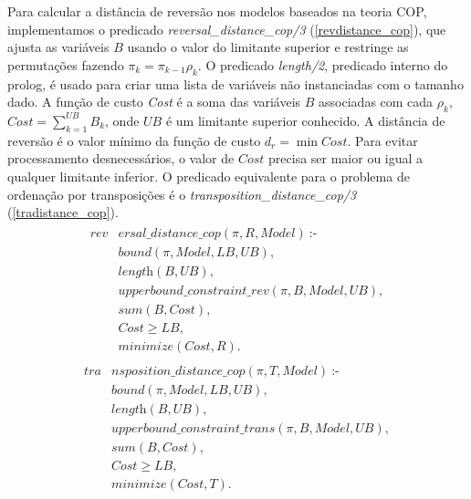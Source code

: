 Para calcular a distância de reversão nos modelos baseados na teoria
COP, implementamos o predicado \textit{reversal\_distance\_cop/3}
(\ref{revdistance_cop}), que ajusta as variáveis $B$ usando o valor do
limitante superior e restringe as permutações fazendo $\pi_{k}
= \pi_{k-1} \rho_{k}$. O predicado \textit{length/2}, predicado
interno do prolog, é usado para criar uma lista de variáveis não
instanciadas com o tamanho dado. A função de custo \textit{Cost} é a
soma das variáveis $B$ associadas com cada $\rho_{k}$, $Cost
= \sum_{k=1}^{UB} B_{k}$, onde $UB$ é um limitante superior
conhecido. A distância de reversão é o valor mínimo da função de custo
$d_{r} = \min Cost$. Para evitar processamento desnecessários, o valor
de $Cost$ precisa ser maior ou igual a qualquer limitante inferior. O
predicado equivalente para o problema de ordenação por transposições é
o \textit{transposition\_distance\_cop/3} (\ref{tradistance_cop}).
\begin{align}
  \label{revdistance_cop}
  \begin{split}
  \textit{rev}&\textit{ersal\_distance\_cop}(\pi, R, Model)~\text{:-} \\
  &\textit{bound}(\pi, Model, LB, UB), \\
  &\textit{length}(B, UB),  \\
  &\textit{upperbound\_constraint\_rev}(\pi, B, Model, UB), \\
  &\textit{sum}(B, Cost),  \\
  &\textit{Cost} \ge \textit{LB},  \\
  &\textit{minimize}(Cost, R). 
  \end{split}
\end{align}
\begin{align}
  \label{tradistance_cop}
  \begin{split}
  \textit{tra}&\textit{nsposition\_distance\_cop}(\pi, T, Model)~\text{:-} \\
  &\textit{bound}(\pi, Model, LB, UB), \\
  &\textit{length}(B, UB),  \\
  &\textit{upperbound\_constraint\_trans}(\pi, B, Model, UB), \\
  &\textit{sum}(B, Cost),  \\
  &\textit{Cost} \ge \textit{LB},  \\
  &\textit{minimize}(Cost, T). 
  \end{split}
\end{align}


